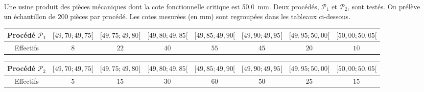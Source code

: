 \documentclass[11pt]{article}
\begin{document}
\begin{exercice}
\label{exo:procedes}
Une usine produit des pièces mécaniques dont la cote fonctionnelle critique est \SI{50,0}{mm}. Deux procédés, $\mathcal{P}_1$ et $\mathcal{P}_2$, sont testés. On prélève un échantillon de $200$ pièces par procédé. Les cotes mesurées (en mm) sont regroupées dans les tableaux ci-dessous.

\begin{center}
\begin{tabular}{|c|c|c|c|c|c|c|c|}
\hline
\textbf{Procédé $\mathcal{P}_1$} & $[49,70; 49,75[$ & $[49,75; 49,80[$ & $[49,80; 49,85[$ & $[49,85; 49,90[$ & $[49,90; 49,95[$ & $[49,95; 50,00[$ & $[50,00; 50,05[$ \\
\hline
Effectifs & $8$ & $22$ & $40$ & $55$ & $45$ & $20$ & $10$ \\
\hline
\end{tabular}
\end{center}

\begin{center}
\begin{tabular}{|c|c|c|c|c|c|c|c|}
\hline
\textbf{Procédé $\mathcal{P}_2$} & $[49,70; 49,75[$ & $[49,75; 49,80[$ & $[49,80; 49,85[$ & $[49,85; 49,90[$ & $[49,90; 49,95[$ & $[49,95; 50,00[$ & $[50,00; 50,05[$ \\
\hline
Effectifs & $5$ & $15$ & $30$ & $60$ & $50$ & $25$ & $15$ \\
\hline
\end{tabular}
\end{center}


\end{exercice}
\end{document}
